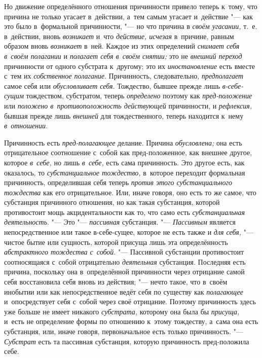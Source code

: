 Но движение определённого отношения причинности привело теперь к~тому, что
причина не только угасает в~действии, а~тем самым угасает и~действие "--- как
это было в~формальной причинности, "--- но что причина в {\em своём угасании,}
т.~е. в~действии, вновь {\em возникает} и~что {\em действие, исчезая}
в~причине, равным образом вновь {\em возникает} в~ней. Каждое из этих определений
{\em снимает себя в~своём полагании} и {\em полагает себя в~своём снятии;} это
не {\em внешний переход} причинности от одного субстрата к~другому; это их
{\em иностановление} есть вместе с~тем их {\em собственное полагание}.
Причинность, следовательно, {\em предполагает} самое себя или
{\em обусловливает себя}. Тождество, бывшее прежде лишь {\em в-себе-сущим}
тождеством, субстратом, теперь {\em определено} поэтому как
{\em пред-положение} или {\em положено в~противоположность действующей}
причинности, и {\em рефлексия,} бывшая прежде лишь {\em внешней} для
тождественного, теперь находится к~нему {\em в~отношении}.


Причинность есть {\em пред-полагающее} делание. Причина {\em обусловлена;} она
есть отрицательное соотношение с~собой как пред-положенное, как внешнее другое,
которое {\em в~себе,} но лишь {\em в~себе,} есть сама причинность. Это другое
есть, как оказалось, то {\em субстанциальное тождество,} в~которое переходит
формальная причинность, определившая себя теперь {\em против этого
субстанциального тождества} как его отрицательное. Или, иначе говоря, оно есть
то же самое, что субстанция причинного отношения, но как такая субстанция,
которой противостоит мощь акцидентальности как то, что само есть
{\em субстанциальная деятельность}. "--- Это "--- {\em пассивная} субстанция.
"--- {\em Пассивным} является непосредственное или такое в-себе-сущее, которое
не есть также и {\em для себя,} "--- чистое бытие или сущность, которой присуща
лишь эта определённость {\em абстрактного тождества с~собой}. "--- Пассивной
субстанции противостоит соотносящаяся с~собой отрицательно {\em деятельная}
субстанция. Последняя есть причина, поскольку она в~определённой причинности
через отрицание самой себя восстановила себя вновь из действия; "--- нечто
такое, что в~своём инобытии или как непосредственное ведёт себя по существу как
{\em полагающее} и~опосредствует себя с~собой через своё отрицание. Поэтому
причинность здесь уже больше не имеет никакого {\em субстрата,} которому она
была бы {\em присуща,} и~есть не определение формы по отношению к~этому
тождеству, а~сама она есть субстанция, или, иначе говоря, первоначальное есть
только причинность. "--- {\em Субстрат} есть та пассивная субстанция, которую
причинность пред-положила себе.

